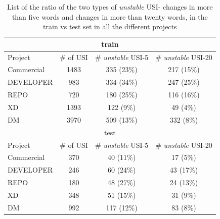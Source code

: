 \begin{table}[]
    \centering
    \caption{List of the ratio of the two types of \emph{unstable} USI- 
    changes in more than five words and changes in more than twenty words, in the train vs test set in all the different projects}
    \begin{tabular}{l|c|c|c}
	 \toprule
     \multicolumn{4}{c}{train} \\
    \toprule
	Project & \hfil \# of USI & \# \emph{unstable} USI-5 & \hfil \# \emph{unstable} USI-20\\
	\hline
	Commercial  & 1483           & 335 (23\%)       & 217 (15\%) \\
      DEVELOPER & \phantom{0}983 &  334 (34\%)      & 247 (25\%) \\
      REPO      & \phantom{0}720 &  180 (25\%)      & 116 (16\%) \\
      XD        & 1393           & 122 \phantom{0}(9\%) & \phantom{0}49 \phantom{0}(4\%) \\
      DM        & 3970         & 509 (13\%) & 332 \phantom{0}(8\%) \\
	\toprule
     \multicolumn{4}{c}{test} \\
    \toprule
	Project & \hfil \# of USI & \# \emph{unstable} USI-5 & \hfil \# \emph{unstable} USI-20\\
	\hline
	  Commercial & 370 & \phantom{0}40 (11\%) & 17 \phantom{0}(5\%) \\ 
      DEVELOPER  & 246 & \phantom{0}60 (24\%) &  43 (17\%) \\
      REPO       & 180 & \phantom{0}48 (27\%) &  24 (13\%) \\ 
      XD         & 348 & \phantom{0}51 (15\%) &  31 \phantom{0}(9\%) \\
      DM         & 992 & 117 (12\%)           &  83 \phantom{0}(8\%) \\
      \toprule
    \end{tabular}
\label{Table:train test ratio}
\end{table}

